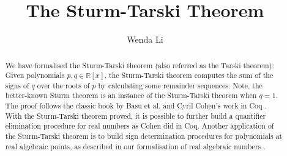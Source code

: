 \documentclass[11pt,a4paper]{article}
\begin{document}
\title{The Sturm-Tarski Theorem}
\author{Wenda Li}
\maketitle

\begin{abstract}
  We have formalised the Sturm-Tarski theorem (also referred as the Tarski theorem): Given polynomials $p, q \in \mathbb{R}[x]$, the Sturm-Tarski theorem computes the sum of the signs of $q$ over the roots of $p$ by calculating some remainder sequences. Note, the better-known Sturm theorem is an instance of the Sturm-Tarski theorem when $q=1$. The proof follows the classic book by Basu et al. \cite{Basu:2006:ARA:1197095} and Cyril Cohen's work in Coq \cite{cohen_phd}. With the Sturm-Tarski theorem proved, it is possible to further build a quantifier elimination procedure for real numbers as Cohen did in Coq.
  Another application of the Sturm-Tarski theorem is to build sign determination procedures for polynomials at real algebraic points, as described in our formalisation of real algebraic numbers \cite{Li_CPP_16}.
\end{abstract}






\end{document}
